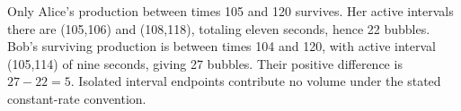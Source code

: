Only Alice's production between times 105 and 120 survives. Her active intervals there are (105,106) and (108,118), totaling eleven seconds, hence 22 bubbles. Bob's surviving production is between times 104 and 120, with active interval (105,114) of nine seconds, giving 27 bubbles. Their positive difference is $27-22=\boxed5$. Isolated interval endpoints contribute no volume under the stated constant-rate convention.
